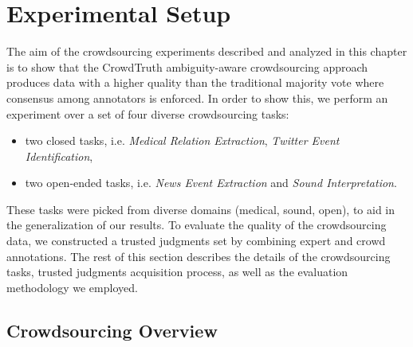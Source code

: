 \section{Experimental Setup}
\label{sec:experimental_setup}

The aim of the crowdsourcing experiments described and analyzed in this chapter is to show that the CrowdTruth ambiguity-aware crowdsourcing approach produces data with a higher quality than the traditional majority vote where consensus among annotators is enforced. In order to show this, we perform an experiment over a set of four diverse crowdsourcing tasks: 
\begin{itemize}
    \item two closed tasks, i.e. \textit{Medical Relation Extraction}, \textit{Twitter Event Identification},
    \item two open-ended tasks, i.e. \textit{News Event Extraction} and \textit{Sound Interpretation}.
\end{itemize}
These tasks were picked from diverse domains (medical, sound, open), to aid in the generalization of our results.  To evaluate the quality of the crowdsourcing data, we constructed a trusted judgments set by combining expert and crowd annotations. The rest of this section describes the details of the crowdsourcing tasks, trusted judgments acquisition process, as well as the evaluation methodology we employed.

\subsection{Crowdsourcing Overview}
\label{subsec:detasets}

